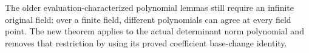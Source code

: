 The older evaluation-characterized polynomial lemmas still require an
infinite original field: over a finite field, different polynomials can
agree at every field point. The new theorem applies to the actual
determinant norm polynomial and removes that restriction by using its
proved coefficient base-change identity.
